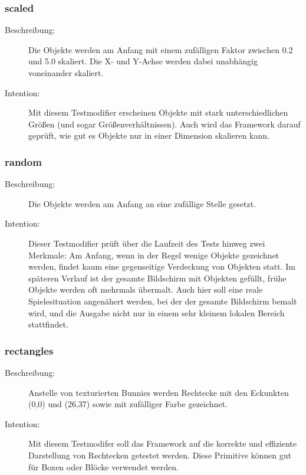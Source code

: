 \subsubsection{scaled}
\begin{description}
\item[Beschreibung:] Die Objekte werden am Anfang mit einem zufälligen Faktor zwischen 0.2 und 5.0 skaliert. Die X- und Y-Achse werden dabei unabhängig voneinander skaliert. \\
\item[Intention:] Mit diesem Testmodifier erscheinen Objekte mit stark unterschiedlichen Größen (und sogar Größenverhältnissen). Auch wird das Framework darauf geprüft, wie gut es Objekte nur in einer Dimension skalieren kann.
\end{description}

\subsubsection{random} 
\begin{description}
\item[Beschreibung:] Die Objekte werden am Anfang an eine zufällige Stelle gesetzt. \\
\item[Intention:] Dieser Testmodifier prüft über die Laufzeit des Tests hinweg zwei Merkmale: Am Anfang, wenn in der Regel wenige Objekte gezeichnet werden, findet kaum eine gegenseitige Verdeckung von Objekten statt. Im späteren Verlauf ist der gesamte Bildschirm mit Objekten gefüllt, frühe Objekte werden oft mehrmals übermalt. Auch hier soll eine reale Spielesituation angenähert werden, bei der der gesamte Bildschirm bemalt wird, und die Ausgabe nicht nur in einem sehr kleinem lokalen Bereich stattfindet.
\end{description}

\subsubsection{rectangles}
\begin{description}
\item[Beschreibung:] Anstelle von texturierten Bunnies werden Rechtecke mit den Eckunkten (0,0) und (26,37) sowie mit zufälliger Farbe gezeichnet. \\
\item[Intention:] Mit diesem Testmodifer soll das Framework auf die korrekte und effiziente Darstellung von Rechtecken getestet werden. Diese Primitive können gut für Boxen oder Blöcke verwendet werden.
\end{description}

